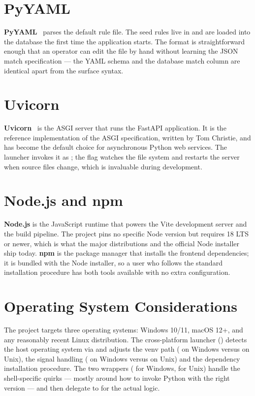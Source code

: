 \section{PyYAML}
\label{sec:tech-yaml}

\textbf{PyYAML}~\cite{pyyaml} parses the default rule file. The
seed rules live in
 and are loaded into the
database the first time the application starts. The format is
straightforward enough that an operator can edit the file by hand
without learning the JSON match specification --- the YAML schema and
the database match column are identical apart from the surface
syntax.

\section{Uvicorn}
\label{sec:tech-uvicorn}

\textbf{Uvicorn}~\cite{uvicorn} is the ASGI server that runs the
FastAPI application. It is the reference implementation of the
ASGI specification, written by Tom Christie, and has become the
default choice for asynchronous Python web services. The launcher
invokes it as ;
the  flag watches the file system and restarts the
server when source files change, which is invaluable during
development.

\section{Node.js and npm}
\label{sec:tech-node}

\textbf{Node.js} is the JavaScript runtime that powers the Vite
development server and the build pipeline. The project pins no
specific Node version but requires 18 LTS or newer, which is what
the major distributions and the official Node installer ship today.
\textbf{npm} is the package manager that installs the frontend
dependencies; it is bundled with the Node installer, so a user who
follows the standard installation procedure has both tools
available with no extra configuration.

\section{Operating System Considerations}
\label{sec:tech-os}

The project targets three operating systems: Windows 10/11, macOS
12+, and any reasonably recent Linux distribution. The
cross-platform launcher () detects the host operating
system via  and adjusts the venv path
( on Windows versus  on
Unix), the signal handling
( on Windows versus  on Unix)
and the dependency installation procedure. The two wrappers
( for Windows,  for Unix) handle the
shell-specific quirks --- mostly around how to invoke Python with
the right version --- and then delegate to  for the
actual logic.

